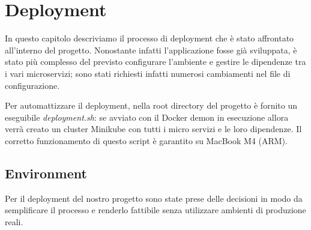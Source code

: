 \chapter{Deployment}
In questo capitolo descriviamo il processo di deployment che è stato affrontato all'interno del progetto. Nonostante infatti l'applicazione fosse già sviluppata, è stato più complesso del previsto configurare l'ambiente e gestire le dipendenze tra i vari microservizi; sono stati richiesti infatti numerosi cambiamenti nel file di configurazione.

\myskip

Per automattizzare il deployment, nella root directory del progetto è fornito un eseguibile \textit{deployment.sh}: se avviato con il Docker demon in esecuzione allora verrà creato un cluster Minikube con tutti i micro servizi e le loro dipendenze. Il corretto funzionamento di questo script è garantito su MacBook M4 (ARM).

\section{Environment}
Per il deployment del nostro progetto sono state prese delle decisioni in modo da semplificare il processo e renderlo fattibile senza utilizzare ambienti di produzione reali.

